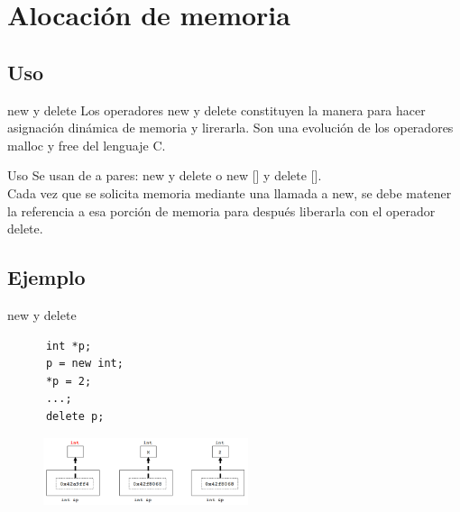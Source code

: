 \documentclass[xcolor=table,spanish,9pt]{beamer}
\begin{document}
\section{Alocación de memoria}

\subsection{Uso}

\begin{frame}[fragile]
  \begin{alertblock}{new y delete}
    Los operadores new y delete constituyen la manera para hacer asignación dinámica de memoria y lirerarla.
    Son una evolución de los operadores malloc y free del lenguaje C.
  \end{alertblock}
  \begin{block}{Uso}
    Se usan de a pares: new y delete  o  new [] y delete [].\\
    Cada vez que se solicita memoria mediante una llamada a new, se debe matener la referencia a esa porción de memoria para después liberarla con el operador 
    delete.
  \end{block}
\end{frame}


\subsection{Ejemplo}

\begin{frame}[fragile]
  \begin{block}{new y delete}
    \begin{lstlisting}
      int *p;
      p = new int;
      *p = 2;
      ...;
      delete p;
    \end{lstlisting}
    \begin{figure}
      \centering
      \includegraphics[width=6cm,height=2cm,keepaspectratio=true,clip=true]
      {./figures/new_operator.png}\\
    \end{figure}
  \end{block}
\end{frame}
\end{document}
